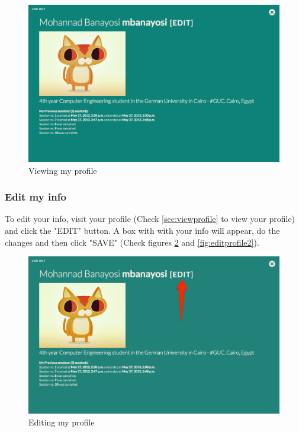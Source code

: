 \begin{figure}[htbp]
\centering 
\includegraphics[width=1.0\linewidth]{steps/MyProfile2} 
\caption{Viewing my profile} 
\label{fig:myprofile2} 
\end{figure} 

\subsubsection{Edit my info}
To edit your info, visit your profile (Check \ref{sec:viewprofile} to view your profile) and click the "EDIT" button. A box with with your info will appear, do the changes and then click "SAVE" (Check figures \ref{fig:editprofile} and \ref{fig:editprofile2}).

\begin{figure}[htbp]
\centering 
\includegraphics[width=1.0\linewidth]{steps/EditProfile} 
\caption{Editing my profile} 
\label{fig:editprofile} 
\end{figure} 

